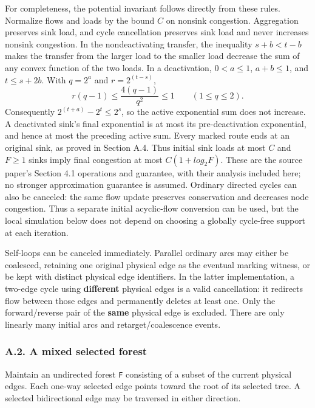 For completeness, the potential invariant follows directly from these rules. Normalize flows and loads by the bound \(C\) on nonsink congestion. Aggregation preserves sink load, and cycle cancellation preserves sink load and never increases nonsink congestion. In the nondeactivating transfer, the inequality \(s+b<t-b\) makes the transfer from the larger load to the smaller load decrease the sum of any convex function of the two loads. In a deactivation, \(0<a≤1\), \(a+b≤1\), and \(t≤s+2b\). With \(q=2^a\) and \(r=2^(t-s)\), \[
r(q-1)\le \frac{4(q-1)}{q^2}\le1\qquad(1\le q\le2).
\] Consequently \(2^(t+a)-2^t≤2^s\), so the active exponential sum does not increase. A deactivated sink's final exponential is at most its pre-deactivation exponential, and hence at most the preceding active sum. Every marked route ends at an original sink, as proved in Section A.4. Thus initial sink loads at most \(C\) and \(F≥1\) sinks imply final congestion at most \(C(1+log_2 F)\). These are the source paper's Section 4.1 operations and guarantee, with their analysis included here; no stronger approximation guarantee is assumed. Ordinary directed cycles can also be canceled: the same flow update preserves conservation and decreases node congestion. Thus a separate initial acyclic-flow conversion can be used, but the local simulation below does not depend on choosing a globally cycle-free support at each iteration.

Self-loops can be canceled immediately. Parallel ordinary arcs may either be coalesced, retaining one original physical edge as the eventual marking witness, or be kept with distinct physical edge identifiers. In the latter implementation, a two-edge cycle using \textbf{different} physical edges is a valid cancellation: it redirects flow between those edges and permanently deletes at least one. Only the forward/reverse pair of the \textbf{same} physical edge is excluded. There are only linearly many initial arcs and retarget/coalescence events.

\hypertarget{af-385fd70686-a.2.-a-mixed-selected-forest}{%
\subsubsection{A.2. A mixed selected forest}\label{af-385fd70686-a.2.-a-mixed-selected-forest}}

Maintain an undirected forest \texttt{F} consisting of a subset of the current physical edges. Each one-way selected edge points toward the root of its selected tree. A selected bidirectional edge may be traversed in either direction.

